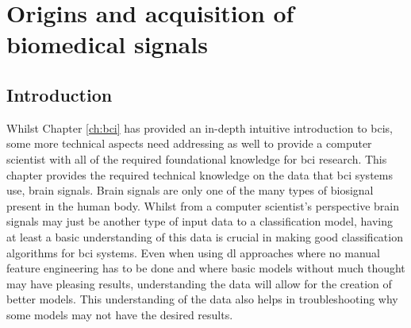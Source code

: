 




\glsresetall

\chapter{Origins and acquisition of biomedical signals}
\label{ch:biomedical_signals}

\section{Introduction}
\label{sec:biomedical_signals_introduction}

Whilst Chapter \ref{ch:bci} has provided an in-depth intuitive introduction to \glspl{bci}, some more technical aspects need addressing as well to provide a computer scientist with all of the required foundational knowledge for \gls{bci} research.
This chapter provides the required technical knowledge on the data that \gls{bci} systems use, brain signals.
Brain signals are only one of the many types of \gls{biosignal} present in the human body.
Whilst from a computer scientist's perspective brain signals may just be another type of input data to a classification model, having at least a basic understanding of this data is crucial in making good classification algorithms for \gls{bci} systems.
Even when using \gls{dl} approaches where no manual feature engineering has to be done and where basic models without much thought may have pleasing results, understanding the data will allow for the creation of better models.
This understanding of the data also helps in troubleshooting why some models may not have the desired results.

